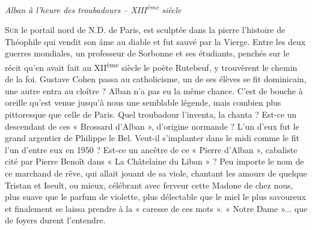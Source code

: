 \begin{center}
  {\Large\itshape Alban à l'heure des troubadours -- XIII\textsuperscript{ème} siècle}
\end{center}

\vspace{1.5em}

\noindent
\lettrine{S}{ur} le portail nord de N.D. de Paris, est sculptée dans la
pierre l'histoire de Théophile qui vendit son âme au diable et fut
sauvé par la Vierge. Entre les deux guerres mondiales, un professeur
de Sorbonne et ses étudiants, penchés sur le récit qu'en avait fait
au XII\textsuperscript{ème} siècle le poète Rutebeuf, y trouvèrent le
chemin de la foi. Gustave Cohen passa au catholicisme, un de ses
élèves se fit dominicain, une autre entra au cloître ? Alban n'a pas
eu la même chance. C'est de bouche à oreille qu'est venue jusqu'à
nous une semblable légende, mais combien plus pittoresque que celle
de Paris. Quel troubadour l'inventa, la chanta ? Est-ce un descendant
de ces « Brossard d'Alban », d'origine normande ? L'un d'eux fut le
grand argentier de Philippe le Bel. Veut-il s'implanter dans le midi
comme le fit l'un d'entre eux en 1950 ? Est-ce un ancêtre de ce
« Pierre d'Alban », cabaliste cité par Pierre Benoît dans
« La Châtelaine du Liban » ? Peu importe le nom de ce marchand de
rêve, qui allait jouant de sa viole, chantant les amours de quelque
Tristan et Iseult, ou mieux, célébrant avec ferveur cette Madone de
chez nous, plus suave que le parfum de violette, plus délectable que
le miel le plus savoureux et finalement se laissa prendre à la
« caresse de ces mots ». « Notre Dame »... que de foyers durent
l'entendre.
